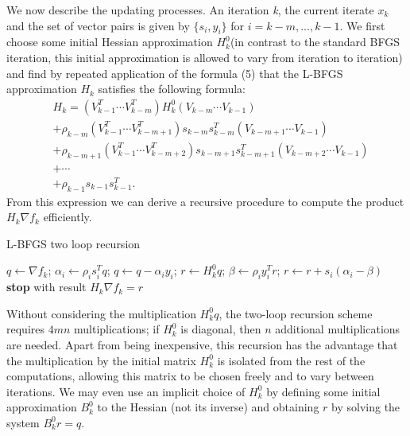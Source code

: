 We now describe the updating processes. An iteration \textit{k}, the current iterate $x_{k}$ and the set of vector pairs is given by $\{s_{i},y_{i}\}$ for $i=k-m, ..., k-1$. We first choose some initial Hessian approximation $H^0_{k}$(in contrast to the standard BFGS iteration, this initial approximation is allowed to vary from iteration to iteration) and find by repeated application of the formula (5) that the L-BFGS approximation $H_{k}$ satisfies the following formula: 
\begin{equation} 
\begin{aligned}
&H_{k}=(V^T_{k-1}\cdots V^T_{k-m})H^0_{k}(V_{k-m}\cdots V_{k-1})\\           
&+\rho_{k-m}(V^T_{k-1}\cdots V^T_{k-m+1})s_{k-m}s^T_{k-m}(V_{k-m+1}\cdots V_{k-1})\\
&+\rho_{k-m+1}(V^T_{k-1}\cdots V^T_{k-m+2})s_{k-m+1}s^T_{k-m+1}(V_{k-m+2}\cdots V_{k-1})\\
&+ \cdots \\
&+\rho_{k-1}s_{k-1}s^T_{k-1}.  
\end{aligned}
\end{equation}
From this expression we can derive a recursive procedure to compute the product $H_{k}\nabla f_{k}$ efficiently.

\begin{algorithm}[H]
	\caption{L-BFGS two loop recursion}
	\label{}
	\begin{algorithmic}[3]
		\State $q \gets \nabla f_{k}$;
        \State $ \alpha_{i} \gets \rho_{i}s^T_{i}q$;
        \State $q \gets q - \alpha_{i}y_{i}$; 
      \EndFor
 	  \State $r \gets H^0_{k}q$;
 	  \State $\beta \gets \rho_{i}y^T_{i}r$; 
 	  \State $r \gets r + s_{i}(\alpha_{i}-\beta)$
 	  \EndFor
	  \State \textbf{stop} with result $H_{k}\nabla f_{k}=r$
	\end{algorithmic}
\end{algorithm}
Without considering the multiplication $H^0_{k}q $, the two-loop recursion scheme requires $4mn$ multiplications; if $H^0_{k}$ is diagonal, then $n$ additional multiplications are needed. Apart from being inexpensive, this recursion has the advantage that the multiplication by the initial matrix $H^0_{k}$ is isolated from the rest of the computations, allowing this matrix to be chosen freely and to vary between iterations. We may even use an implicit choice of $H^0_{k}$ by defining some initial approximation $B^0_{k}$ to the Hessian (not its inverse) and obtaining $r$ by solving the system $B^0_{k}r = q$. 

